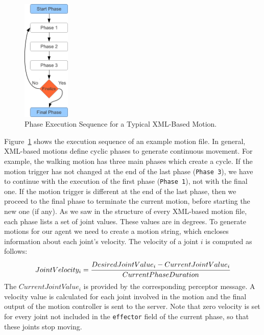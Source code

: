 \begin{figure}[t!]
\centering
  \includegraphics[width=0.2\textwidth]{Chapter3/figures/MotionSequence.pdf}
  \caption{Phase Execution Sequence for a Typical XML-Based Motion.}
  \label{fig:PhaseSequence}
\end{figure}


Figure~\ref{fig:PhaseSequence} shows the execution sequence of an example motion file. In general, XML-based motions define cyclic phases to generate continuous movement. For example, the walking motion has three main phases which create a cycle. If the motion trigger has not changed at the end of the last phase (\texttt{Phase 3}), we have to continue with the execution of the first phase (\texttt{Phase 1}), not with the final one. If the motion trigger is different at the end of the last phase, then we proceed to the final phase to terminate the current motion, before starting the new one (if any). As we saw in the structure of every XML-based motion file, each phase lists a set of joint values. These values are in degrees. To generate motions for our agent we need to create a motion string, which encloses information about each joint's velocity. The velocity of a joint $i$ is computed as follows:
\[
JointVelocity_i = \cfrac{DesiredJointValue_i - CurrentJointValue_i}{CurrentPhaseDuration}
\]
The $CurrentJointValue_i$ is provided by the corresponding perceptor message. 
A velocity value is calculated for each joint involved in the motion and the final output of the motion controller is sent to the server. Note that zero velocity is set for every joint not included in the \texttt{effector} field of the current phase, so that these joints stop moving. 



